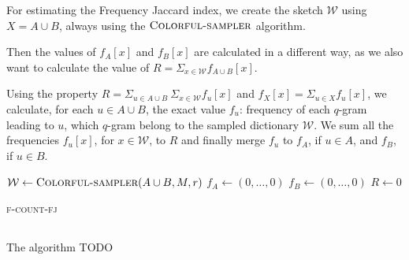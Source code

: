 For estimating the Frequency Jaccard index, we create the sketch $\mathcal{W}$ using $X = A \cup B$,
always using the $\textsc{Colorful-sampler}$ algorithm. 

Then the values of $f_{A}[x]$ and $f_{B}[x]$ are calculated in a different way, as we also want to calculate the value of $R = \Sigma_{x \in \mathcal{W}} f_{A \cup B}[x]$.

Using the property $R = \Sigma_{u \in A \cup B}\ \Sigma_{x \in \mathcal{W}} f_{u}[x] $ and $f_{X}[x] = \Sigma_{u \in X}{ f_{u}[x] }$, we calculate, for each $u \in A \cup B$,  the exact value $f_{u}$: frequency of each $q$-gram leading to $u$, which $q$-gram belong to the sampled dictionary $\mathcal{W}$.
We sum all the frequencies $f_u[x]$, for $x \in \mathcal{W}$, to $R$ and finally merge $f_{u}$ to $f_A$, if $u \in A$, and $f_B$, if $u \in B$.

\begin{algorithm}[h]
	\small
	\DontPrintSemicolon
	\BlankLine
	$\mathcal{W} \gets \textsc{Colorful-sampler}(A \cup B, M, r)$ \;
	$f_A \gets (0,\ldots,0)$\;
	$f_B \gets (0,\ldots,0)$\;
	$R \gets 0$\;
	\BlankLine
	\BlankLine
	\caption{\textsc{f-count-fj}}
	\label{alg:randomsample}
	\label{alg:sample}
\end{algorithm}

\subsection*{\fsamp}

The \fsamp algorithm TODO

\clearpage
